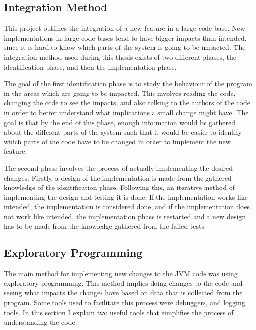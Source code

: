 

\subsection{Integration Method}
This project outlines the integration of a new feature in a large code base. New implementations in large code bases tend to have bigger impacts than intended, since it is hard to know which parts of the system is going to be impacted. The integration method used during this thesis exists of two different phases, the identification phase, and then the implementation phase. 

The goal of the first identification phase is to study the behaviour of the program in the areas which are going to be impacted. This involves reading the code, changing the code to see the impacts, and also talking to the authors of the code in order to better understand what implications a small change might have. The goal is that by the end of this phase, enough information would be gathered about the different parts of the system such that it would be easier to identify which parts of the code have to be changed in order to implement the new feature.

The second phase involves the process of actually implementing the desired changes. Firstly, a design of the implementation is made from the gathered knowledge of the identification phase. Following this, an iterative method of implementing the design and testing it is done. If the implementation works like intended, the implementation is considered done, and if the implementation does not work like intended, the implementation phase is restarted and a new design has to be made from the knowledge gathered from the failed tests.

\subsection{Exploratory Programming}
The main method for implementing new changes to the JVM code was using exploratory programming. This method implies doing changes to the code and seeing what impacts the changes have based on data that is collected from the program. Some tools used to facilitate this process were debuggers, and logging tools. In this section I explain two useful tools that simplifies the process of understanding the code.
